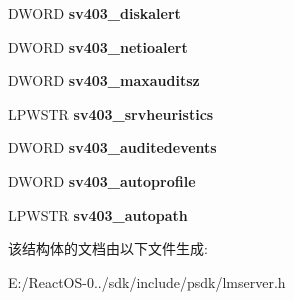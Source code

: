 \begin{DoxyCompactItemize}
D\+W\+O\+RD {\bfseries sv403\+\_\+diskalert}
\item 
\mbox{\label{struct___s_e_r_v_e_r___i_n_f_o__403_a64c69af95ff765786653d51562c51aa1}} 
D\+W\+O\+RD {\bfseries sv403\+\_\+netioalert}
\item 
\mbox{\label{struct___s_e_r_v_e_r___i_n_f_o__403_a2294bae951dd596d2c5249edd092083f}} 
D\+W\+O\+RD {\bfseries sv403\+\_\+maxauditsz}
\item 
\mbox{\label{struct___s_e_r_v_e_r___i_n_f_o__403_a086a6a4a6e9e5f5f6742689f14b763c4}} 
L\+P\+W\+S\+TR {\bfseries sv403\+\_\+srvheuristics}
\item 
\mbox{\label{struct___s_e_r_v_e_r___i_n_f_o__403_a7b95c63c7cf9e77d58a4bef96a1ec8db}} 
D\+W\+O\+RD {\bfseries sv403\+\_\+auditedevents}
\item 
\mbox{\label{struct___s_e_r_v_e_r___i_n_f_o__403_ad4f85d633ca68fb39ee955b0b1d36ef8}} 
D\+W\+O\+RD {\bfseries sv403\+\_\+autoprofile}
\item 
\mbox{\label{struct___s_e_r_v_e_r___i_n_f_o__403_a2fdfb9c1651336b159360a6a95a457c4}} 
L\+P\+W\+S\+TR {\bfseries sv403\+\_\+autopath}
\end{DoxyCompactItemize}


该结构体的文档由以下文件生成\+:\begin{DoxyCompactItemize}
\item 
E\+:/\+React\+O\+S-\/0../sdk/include/psdk/lmserver.\+h\end{DoxyCompactItemize}

